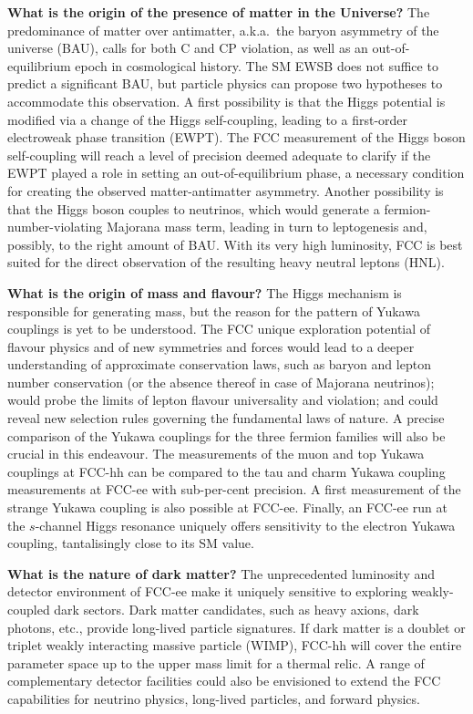 \textbf{What is the origin of the presence of matter in the Universe?} 
The predominance of matter over antimatter, a.k.a.\ the baryon asymmetry of the universe (BAU), calls for both C and CP violation, 
as well as an out-of-equilibrium epoch in cosmological history. 
The SM EWSB does not suffice to predict a significant BAU, but particle physics can propose two hypotheses to accommodate this observation. 
A first possibility is that the Higgs potential is modified via a change of the Higgs self-coupling, leading to a first-order electroweak phase transition (EWPT). 
The FCC measurement of the Higgs boson self-coupling will reach a level of precision deemed adequate to clarify 
if the EWPT played a role in setting an out-of-equilibrium phase, 
a necessary condition for creating the observed matter-antimatter asymmetry. 
Another possibility is that the Higgs boson couples to neutrinos, 
which would generate a fermion-number-violating Majorana mass term, 
leading in turn to leptogenesis and, possibly, to the right amount of BAU. 
With its very high luminosity, FCC is best suited for the direct observation of the resulting heavy neutral leptons (HNL).

\textbf{What is the origin of mass and flavour?} 
The Higgs mechanism is responsible for generating mass, but the reason for the pattern of Yukawa couplings is yet to be understood. 
The FCC unique exploration potential of flavour physics and of new symmetries and forces 
would lead to a deeper understanding of approximate conservation laws,
such as baryon and lepton number conservation 
(or the absence thereof in case of Majorana neutrinos);
would probe the limits of lepton flavour universality and violation; and 
could reveal new selection rules governing the fundamental laws of nature. 
A precise comparison of the  Yukawa couplings for the three fermion families will also be crucial in this endeavour. 
The measurements of the muon and top Yukawa couplings at FCC-hh can be compared to the tau and charm Yukawa coupling measurements at FCC-ee with sub-per-cent precision. 
A first measurement of the strange Yukawa coupling is also possible at FCC-ee. 
Finally, an FCC-ee run at the $s$-channel Higgs resonance 
uniquely offers sensitivity to the electron Yukawa coupling, tantalisingly close to its SM value.  

\textbf{What is the nature of dark matter?} 
The unprecedented luminosity and detector environment of FCC-ee make it uniquely sensitive to exploring weakly-coupled dark sectors. 
Dark matter candidates, such as heavy axions, dark photons, etc., provide long-lived particle signatures.  
If dark matter is a doublet or triplet weakly interacting massive particle (WIMP), 
FCC-hh will cover the entire parameter space up to the upper mass limit for a thermal relic. 
A range of complementary detector facilities could also be envisioned to extend the FCC capabilities for neutrino physics, long-lived particles, and forward physics.

